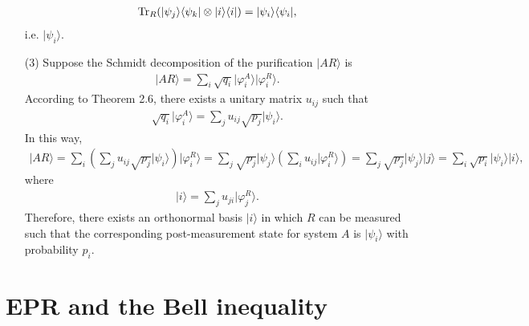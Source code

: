 \documentclass[en]{sol-man}
\begin{document}
\begin{sol}
\begin{itemize}
        \begin{align}
            \operatorname{Tr}_R(\lvert\psi_j\rangle\langle\psi_k\rvert\otimes\lvert i\rangle\langle i\rvert)=\lvert\psi_i\rangle\langle\psi_i\rvert,
        \end{align}
        i.e. $\lvert\psi_i\rangle$.
        \item[(3)] Suppose the Schmidt decomposition of the purification $\lvert AR\rangle$ is
        \begin{align}
            \lvert AR\rangle=\sum_i\sqrt{q_i}\lvert\varphi_i^A\rangle\lvert\varphi_i^R\rangle.
        \end{align}
        According to Theorem 2.6, there exists a unitary matrix $u_{ij}$ such that
        \begin{align}
            \sqrt{q_i}\lvert\varphi_i^A\rangle=\sum_{j}u_{ij}\sqrt{p_j}\lvert\psi_i\rangle.
        \end{align}
        In this way,
        \begin{align}
            \lvert AR\rangle=\sum_i\left(\sum_{j}u_{ij}\sqrt{p_j}\lvert\psi_i\rangle\right)\lvert\varphi_i^R\rangle=\sum_j\sqrt{p_j}\lvert\psi_j\rangle\left(\sum_iu_{ij}\lvert\varphi_i^R\rangle\right)=\sum_j\sqrt{p_j}\lvert\psi_j\rangle\lvert j\rangle=\sum_i\sqrt{p_i}\lvert\psi_i\rangle\lvert i\rangle,
        \end{align}
        where
        \begin{align}
            \lvert i\rangle=\sum_ju_{ji}\lvert\varphi_j^R\rangle.
        \end{align}
        Therefore, there exists an orthonormal basis $\lvert i\rangle$ in which $R$ can be measured such that the corresponding post-measurement state for system $A$ is $\lvert\psi_i\rangle$ with probability $p_i$.
    \end{itemize}
\end{sol}

\section{EPR and the Bell inequality}
\end{document}
